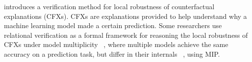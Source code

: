 \cite{CFXROBUSTNESS} introduces a verification method for local robustness of counterfactual explanations (CFXs). CFXs are explanations provided to help understand why a machine learning model made a certain prediction. Some researchers use relational verification as a formal framework for reasoning the local robustness of CFXs under model multiplicity  ~\cite{CFXROBUSTNESS}, where multiple models achieve the same accuracy on a prediction task, but differ in their internals ~\cite{PREDICTIVEMULTIPICITY}, using MIP.

